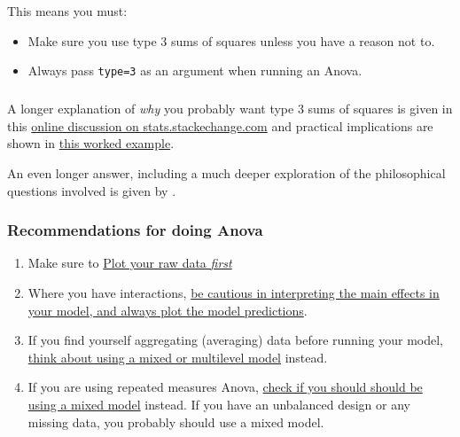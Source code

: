 \documentclass[]{article}
\providecommand{\tightlist}{%
  \setlength{\itemsep}{0pt}\setlength{\parskip}{0pt}}
\let\oldsubparagraph\subparagraph
\renewcommand{\subparagraph}[1]{\oldsubparagraph{#1}\mbox{}}
\begin{document}
This means you must:

\begin{itemize}
\tightlist
\item
  Make sure you use type 3 sums of squares unless you have a reason not to.
\item
  Always pass \texttt{type=3} as an argument when running an Anova.
\end{itemize}

\hypertarget{section-10}{%
\subparagraph{}\label{section-10}}

A longer explanation of \emph{why} you probably want type 3 sums of squares is given
in this
\href{https://stats.stackexchange.com/questions/60362/choice-between-type-i-type-ii-or-type-iii-anova}{online discussion on stats.stackechange.com}
and practical implications are shown in
\href{http://dwoll.de/rexrepos/posts/anovaSStypes.html}{this worked example}.

An even longer answer, including a much deeper exploration of the philosophical
questions involved is given by \citet{venables1998exegeses}.

\hypertarget{anova-recommendations}{%
\subsubsection*{Recommendations for doing Anova}\label{anova-recommendations}}

\begin{enumerate}
\def\labelenumi{\arabic{enumi}.}
\item
  Make sure to \protect\hyperlink{graphics}{Plot your raw data \emph{first}}
\item
  Where you have interactions,
  \protect\hyperlink{understanding-interactions}{be cautious in interpreting the main effects in your model, and always plot the model predictions}.
\item
  If you find yourself aggregating (averaging) data before running your model,
  \protect\hyperlink{multilevel-models}{think about using a mixed or multilevel model} instead.
\item
  If you are using repeated measures Anova,
  \protect\hyperlink{multilevel-models}{check if you should should be using a mixed model}
  instead. If you have an unbalanced design or any missing data, you probably
  should use a mixed model.
\end{enumerate}
\end{document}
